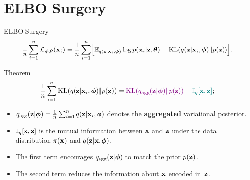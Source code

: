 \documentclass{beamer}
\begin{document}
\section{ELBO Surgery}
\begin{frame}{ELBO Surgery}
	\vspace{-0.3cm}
	\[
	    \frac{1}{n} \sum_{i=1}^n \mathcal{L}_{\boldsymbol{\phi}, \boldsymbol{\theta}}(\mathbf{x}_i) = \frac{1}{n} \sum_{i=1}^n \Bigl[ \mathbb{E}_{q(\mathbf{z} | \mathbf{x}_i, \boldsymbol{\phi})} \log p(\mathbf{x}_i | \mathbf{z}, \boldsymbol{\theta}) - \mathrm{KL}(q(\mathbf{z} | \mathbf{x}_i, \boldsymbol{\phi}) \| p(\mathbf{z})) \Bigr].
	\]
	\vspace{-0.3cm}
	\begin{block}{Theorem}
		\vspace{-0.5cm}
		\[
		    \frac{1}{n} \sum_{i=1}^n \mathrm{KL}(q(\mathbf{z} | \mathbf{x}_i, \boldsymbol{\phi}) \| p(\mathbf{z})) = {\color{violet} \mathrm{KL}(q_{\text{agg}}(\mathbf{z} | \boldsymbol{\phi}) \| p(\mathbf{z}))} + {\color{teal}\mathbb{I}_{q} [\mathbf{x}, \mathbf{z}]};
		\]
		\vspace{-0.5cm}
		\begin{itemize}
			\item $q_{\text{agg}}(\mathbf{z} | \boldsymbol{\phi}) = \frac{1}{n} \sum_{i=1}^n q(\mathbf{z} | \mathbf{x}_i, \boldsymbol{\phi})$ denotes the \textbf{aggregated} variational posterior.
			\item $\mathbb{I}_{q} [\mathbf{x}, \mathbf{z}]$ is the mutual information between $\mathbf{x}$ and $\mathbf{z}$ under the data distribution $\pi(\mathbf{x})$ and $q(\mathbf{z} | \mathbf{x}, \boldsymbol{\phi})$.
			\item  {\color{violet} The first term} encourages $q_{\text{agg}}(\mathbf{z} | \boldsymbol{\phi})$ to match the prior $p(\mathbf{z})$.
			\item {\color{teal} The second term} reduces the information about $\mathbf{x}$ encoded in~$\mathbf{z}$.
		\end{itemize}
	\end{block}
\end{frame}
\end{document}
